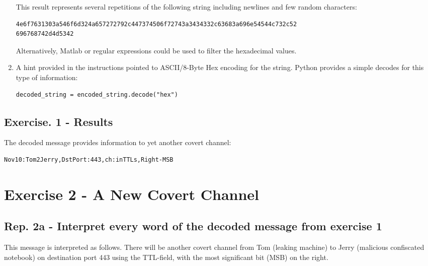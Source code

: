 \documentclass{article}
\begin{document}
\begin{enumerate}
This result represents several repetitions of the following string including newlines and few random characters:

\begin{verbatim}
4e6f7631303a546f6d324a657272792c447374506f72743a3434332c63683a696e54544c732c52
696768742d4d5342
\end{verbatim}

Alternatively, Matlab or regular expressions could be used to filter the hexadecimal values.

\item A hint provided in the instructions pointed to ASCII/8-Byte Hex encoding for the string. Python provides a simple decodes for this type of information:

\begin{verbatim}
decoded_string = encoded_string.decode("hex")
\end{verbatim}
\end{enumerate}

\subsection*{Exercise. 1 - Results}
The decoded message provides information to yet another covert channel:
\begin{verbatim}
Nov10:Tom2Jerry,DstPort:443,ch:inTTLs,Right-MSB
\end{verbatim}





\newpage
\section*{Exercise 2 - A New Covert Channel}

\subsection*{Rep. 2a - Interpret every word of the decoded message from exercise 1}
This message is interpreted as follows. There will be another covert channel from Tom (leaking machine) to Jerry (malicious confiscated notebook) on destination port 443 using the TTL-field, with the most significant bit (MSB) on the right. 
\end{document}
